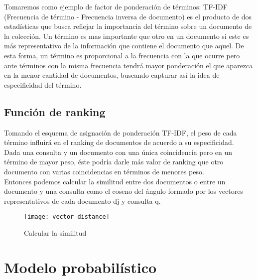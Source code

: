 Tomaremos como ejemplo de factor de ponderación de términos: TF-IDF (Frecuencia de término - Frecuencia inversa de documento) es el producto de dos estadísticas que busca reflejar la importancia del término sobre un documento de la colección. Un término es mas importante que otro en un documento si este es más representativo de la información que contiene el documento que aquel. De esta forma, un término es proporcional a la frecuencia con la que ocurre pero ante términos con la misma frecuencia tendrá mayor ponderación el que aparezca en la menor cantidad de documentos, buscando capturar así la idea de especificidad del término. \\


\subsection{Función de ranking}

Tomando el esquema de asignación de ponderación TF-IDF, el peso de cada término influirá en el ranking de documentos de acuerdo a su especificidad. \\ 

Dada una consulta y un documento con una única coincidencia pero en un término de mayor peso, éste podría darle más valor de ranking que otro documento con varias coincidencias en términos de menores peso. \\

Entonces podemos calcular la similitud entre dos documentos o entre un documento y una consulta como el coseno del ángulo formado por los vectores representativos de cada documento dj y consulta q. 

				\begin{figure}[h]
					\texttt{[image: vector-distance]}
					\centering
					\caption{Calcular la similitud}
				\end{figure}


\section{Modelo probabilístico}

